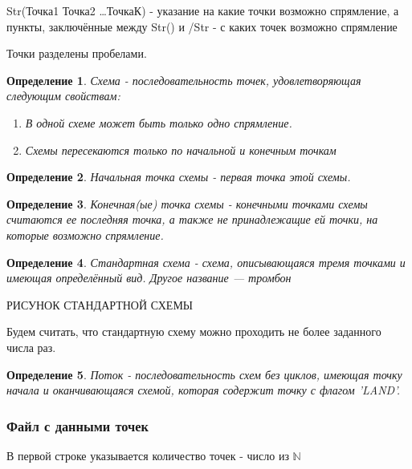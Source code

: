 \documentclass[12pt, a4 paper]{article}
\theoremstyle{plain}
\newtheorem{definition}{Определение}
\begin{document}
Str(Точка1 Точка2  \ldots  ТочкаК) - указание на какие точки возможно спрямление, а пункты, заключённые между Str() и /Str - с каких точек возможно спрямление

Точки разделены пробелами.

\begin{definition}{Схема - последовательность точек, удовлетворяющая следующим свойствам:
\begin{enumerate}
	\item В одной схеме может быть только одно спрямление.
	\item Схемы пересекаются только по начальной и конечным точкам
\end{enumerate}
}
\end{definition}

\begin{definition}{Начальная точка схемы - первая точка  этой схемы.}
\end{definition}

\begin{definition}{Конечная(ые) точка схемы - конечными точками схемы считаются ее последняя точка, а также не принадлежащие ей точки, на которые возможно спрямление.}
\end{definition}

\begin{definition}{Стандартная схема - схема, описывающаяся тремя точками и имеющая определённый вид. Другое название --- тромбон}
\end{definition}

РИСУНОК СТАНДАРТНОЙ СХЕМЫ

Будем считать, что стандартную схему можно проходить не более заданного числа раз.

\begin{definition}{Поток - последовательность схем без циклов, имеющая точку начала и оканчивающаяся схемой, которая содержит точку с флагом 'LAND'.}
\end{definition}


\subsubsection*{Файл с данными точек}

В первой строке указывается количество точек - число из $\mathbb{N}$
\end{document}
